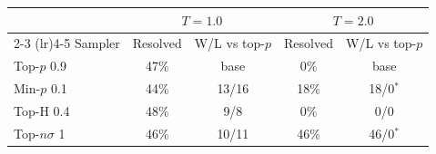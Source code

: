 \begin{tabular}{lcccc}
\toprule
 & \multicolumn{2}{c}{$T{=}1.0$} & \multicolumn{2}{c}{$T{=}2.0$} \\
\cmidrule(lr){2-3} \cmidrule(lr){4-5}
Sampler & Resolved & W/L vs top-$p$ & Resolved & W/L vs top-$p$ \\
\midrule
Top-$p$ 0.9 & 47\% & base & 0\% & base \\
Min-$p$ 0.1 & 44\% & 13/16 & 18\% & 18/0$^{*}$ \\
Top-H 0.4 & 48\% & 9/8 & 0\% & 0/0 \\
Top-$n\sigma$ 1 & 46\% & 10/11 & 46\% & 46/0$^{*}$ \\
\bottomrule
\end{tabular}
